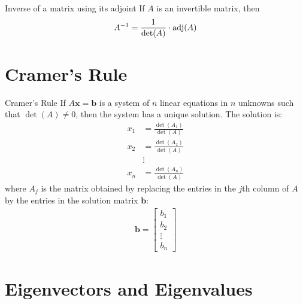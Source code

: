 \documentclass[\main/notes.tex]{subfiles}
\begin{document}
			\begin{theorem}{Inverse of a matrix using its adjoint}
				If $A$ is an invertible matrix, then
				\begin{align*}
					A^{-1} = \frac{1}{\det(A)} \cdot \operatorname{adj}(A)
				\end{align*}
			\end{theorem}

		\section{Cramer's Rule}
			\begin{definition}{Cramer's Rule}
				If $A\mathbf{x} = \mathbf{b}$ is a system of $n$ linear equations in $n$ unknowns such that $\det(A) \neq 0$, then the system has a unique solution. The solution is:
				\begin{align*}
					x_{1} &= \frac{\det(A_{1})}{\det(A)}\\
					x_{2} &= \frac{\det(A_{2})}{\det(A)}\\
					&\vdots\\
					x_{n} &= \frac{\det(A_{n})}{\det(A)}
				\end{align*}
				where $A_{j}$ is the matrix obtained by replacing the entries in the $j$th column of $A$ by the entries in the solution matrix $\mathbf{b}$:
				\begin{align*}
					\mathbf{b} = \begin{bmatrix}
						b_{1}\\
						b_{2}\\
						\vdots\\
						b_{n}
					\end{bmatrix}
				\end{align*}
			\end{definition}

		\section{Eigenvectors and Eigenvalues}

\end{document}
